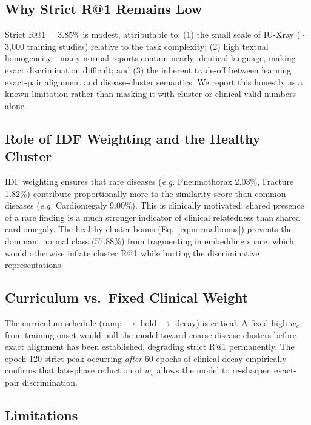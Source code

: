 \documentclass[11pt, a4paper]{article}
\newcommand{\eg}{\textit{e.g.}}
\begin{document}
\subsection{Why Strict R@1 Remains Low}

Strict R@1 = 3.85\% is modest, attributable to: (1) the small scale of
IU-Xray ($\sim$3,000 training studies) relative to the task complexity;
(2) high textual homogeneity---many normal reports contain nearly identical
language, making exact discrimination difficult; and (3) the inherent
trade-off between learning exact-pair alignment and disease-cluster
semantics.
We report this honestly as a known limitation rather than masking it with
cluster or clinical-valid numbers alone.

\subsection{Role of IDF Weighting and the Healthy Cluster}

IDF weighting ensures that rare diseases (\eg{} Pneumothorax 2.03\%,
Fracture 1.82\%) contribute proportionally more to the similarity score
than common diseases (\eg{} Cardiomegaly 9.00\%).
This is clinically motivated: shared presence of a rare finding is a much
stronger indicator of clinical relatedness than shared cardiomegaly.
The healthy cluster bonus (Eq.~\ref{eq:normalbonus}) prevents the dominant
normal class (57.88\%) from fragmenting in embedding space, which would
otherwise inflate cluster R@1 while hurting the discriminative representations.

\subsection{Curriculum vs.\ Fixed Clinical Weight}

The curriculum schedule (ramp $\to$ hold $\to$ decay) is critical.
A fixed high $w_c$ from training onset would pull the model toward coarse
disease clusters before exact alignment has been established, degrading
strict R@1 permanently.
The epoch-120 strict peak occurring \emph{after} 60 epochs of clinical
decay empirically confirms that late-phase reduction of $w_c$ allows the
model to re-sharpen exact-pair discrimination.

\subsection{Limitations}
\end{document}
